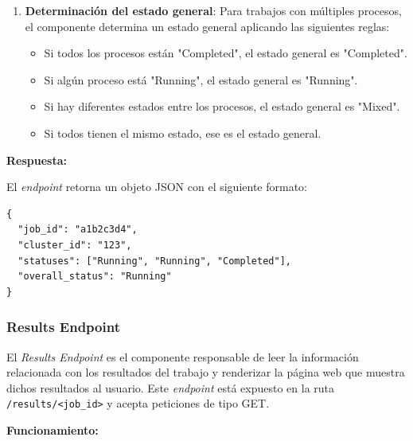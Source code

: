\begin{enumerate}
	\item \textbf{Determinación del estado general}: Para trabajos con múltiples procesos, el componente determina un estado general aplicando las siguientes reglas:
	\begin{itemize}
		\item Si todos los procesos están "Completed", el estado general es "Completed".
		\item Si algún proceso está "Running", el estado general es "Running".
		\item Si hay diferentes estados entre los procesos, el estado general es "Mixed".
		\item Si todos tienen el mismo estado, ese es el estado general.
	\end{itemize}
\end{enumerate}

\textbf{Respuesta:}

El \textit{endpoint} retorna un objeto JSON con el siguiente formato:

\begin{verbatim}
{
  "job_id": "a1b2c3d4",
  "cluster_id": "123",
  "statuses": ["Running", "Running", "Completed"],
  "overall_status": "Running"
}
\end{verbatim}

\subsubsection{Results Endpoint}
\noindent

El \textit{Results Endpoint} es el componente responsable de leer la información relacionada con los resultados del trabajo y renderizar la página web que muestra dichos resultados al usuario. Este \textit{endpoint} está expuesto en la ruta \texttt{/results/<job\_id>} y acepta peticiones de tipo GET.

\textbf{Funcionamiento:}

